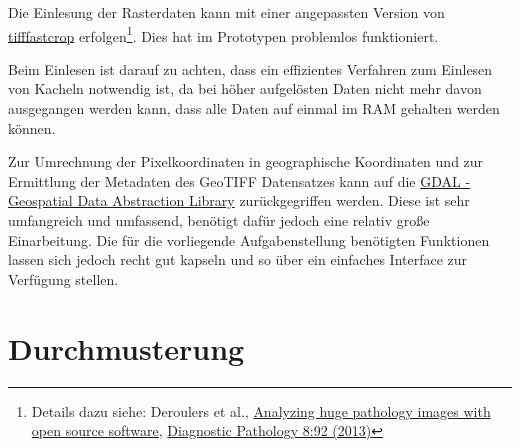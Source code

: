 \documentclass[
11pt, %
a4paper, %
oneside, %
pdfspacing, %
headinclude,
BCOR5mm, %
ngerman, %
bibtotocnumbered,
]{scrartcl}
\begin{document}
	Die Einlesung der Rasterdaten kann mit einer angepassten Version von \href{https://www.imnc.in2p3.fr/pagesperso/deroulers/software/largetifftools/tifffastcrop.html}{tifffastcrop} erfolgen\footnote{
	Details dazu siehe: Deroulers et al., \href{https://www.imnc.in2p3.fr/pagesperso/deroulers/software/ndpitools/article_diagnostic_pathology.pdf}{Analyzing huge pathology images with open source software}, \href{http://www.diagnosticpathology.org/content/8/1/92}{Diagnostic Pathology 8:92 (2013)}}. 
	Dies hat im Prototypen problemlos funktioniert.
	
	Beim Einlesen ist darauf zu achten, dass ein effizientes Verfahren zum Einlesen von Kacheln notwendig ist, da bei höher aufgelösten Daten nicht mehr davon ausgegangen werden kann, dass alle Daten auf einmal im RAM gehalten werden können.
	
	Zur Umrechnung der Pixelkoordinaten in geographische Koordinaten und zur Ermittlung der Metadaten des GeoTIFF Datensatzes kann auf die  \href{http://www.gdal.org//}{GDAL - Geospatial Data Abstraction Library} zurückgegriffen werden. Diese ist sehr umfangreich und umfassend, benötigt dafür jedoch eine relativ große Einarbeitung. Die für die vorliegende Aufgabenstellung benötigten Funktionen lassen sich jedoch recht gut kapseln und so über ein einfaches Interface zur Verfügung stellen.
	
	\skippingparagraph
	\skippingparagraph	%
	
	

\section{Durchmusterung}
\end{document}
